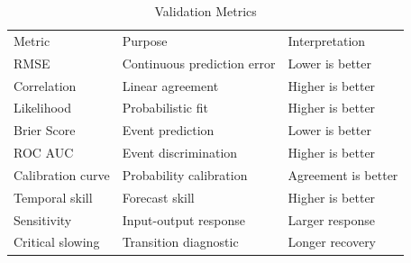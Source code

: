 \begin{table}[tb]
\caption{\label{tab:validation_metrics}Validation Metrics}
\footnotesize
\begin{ruledtabular}
\begin{tabular}{lll}
Metric & Purpose & Interpretation \\
RMSE & Continuous prediction error & Lower is better \\
Correlation & Linear agreement & Higher is better \\
Likelihood & Probabilistic fit & Higher is better \\
Brier Score & Event prediction & Lower is better \\
ROC AUC & Event discrimination & Higher is better \\
Calibration curve & Probability calibration & Agreement is better \\
Temporal skill & Forecast skill & Higher is better \\
Sensitivity & Input-output response & Larger response \\
Critical slowing & Transition diagnostic & Longer recovery \\
\end{tabular}
\end{ruledtabular}
\end{table}
